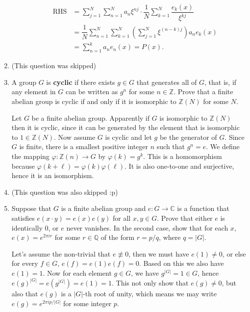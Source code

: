 \documentclass{article}
\begin{document}
\begin{enumerate}
\begin{enumerate}
\begin{solution}
            \begin{align}
                \text{RHS} &= \sum_{j=1}^N \sum_{n=1}^N a_n\xi^{nj} \cdot \dfrac1N \sum_{k=1}^N \dfrac{e_k(x)}{\xi^{kj}}\\
                &= \dfrac1N \sum_{n=1}^N\sum_{k=1}^N \left(\sum_{j=1}^N \xi^{(n-k)j}\right) a_ne_k(x)\\
                &= \sum_{n=1}^k a_n e_n(x) = P(x).
            \end{align}
        \end{solution}
    \end{enumerate}
    
    \item (This question was skipped)
    \item A group $G$ is \textbf{cyclic} if there exists $g\in G$ that generates all of $G$, that is, if any element in $G$ can be written
    as $g^n$ for some $n\in\mathbb Z$. Prove that a finite abelian group is cyclic if and only if it is isomorphic to $\mathbb Z(N)$
    for some $N$.

    \begin{solution}
        Let $G$ be a finite abelian group. Apparently if $G$ is isomorphic to $\mathbb Z(N)$ then it is cyclic, since it can be generated by
        the element that is isomorphic to $1\in\mathbb Z(N)$.
        Now assume $G$ is cyclic and let $g$ be the generator of $G$. Since $G$ is finite, there is a smallest positive integer $n$ such that
        $g^n=e$. We define the mapping $\varphi: \mathbb Z(n)\to G$ by $\varphi(k)=g^k$. This is a homomorphism because
        $\varphi(k+\ell)=\varphi(k)\varphi(\ell)$. It is also one-to-one and surjective, hence it is an isomorphism.
    \end{solution}

    \item (This question was also skipped :p)
    \item Suppose that $G$ is a finite abelian group and $e: G\to \mathbb C$ is a function that satisfies $e(x\cdot y) = e(x)e(y)$ for all
    $x,y\in G$. Prove that either $e$ is identically $0$, or $e$ never vanishes. In the second case, show that for each $x$, $e(x)=e^{2\pi ir}$
    for some $r\in\mathbb Q$  of the form $r=p/q$, where $q=|G|$. 

    \begin{solution}
        Let's assume the non-trivial that $e\not\equiv 0$, then we must have $e(1)\neq 0$, or else for every $f\in G$, $e(f)=e(1)e(f)=0$.
        Based on this we also have $e(1)=1$.
        Now for each element $g\in G$, we have $g^{|G|}=1\in G$, hence
        $e(g)^{|G|} =e(g^{|G|})=e(1)=1$. This not only show that $e(g)\neq 0$, but also that $e(g)$ is a $|G|$-th root of unity, which means
        we may write $e(g)=e^{2\pi ip/|G|}$ for some integer $p$.
    \end{solution}


\end{enumerate}
\end{document}
